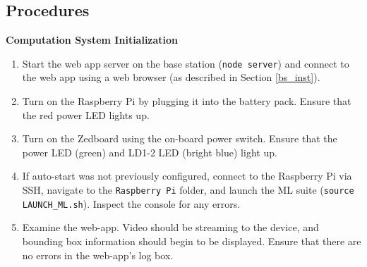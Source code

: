
\newcommand{\checkbox}{\makebox[3ex][r]{\Large{$\square$}}}

\newenvironment{checklist}[1]{%
  \renewcommand{\item}[2]{%
    ##1\dotfill\makebox{\uppercase{##2}}\\
  }
  \newcommand{\step}[1]{%
    \hspace*{10em}-\hspace*{\labelsep}##1\\
  }
  \begin{tabular}{p{0.9\linewidth}}
     \toprule
       \multicolumn{1}{c}{\textbf{\uppercase{#1}}}\\
     \midrule
}{\bottomrule\end{tabular}\vspace{1em}}


\subsection{Procedures}

\textbf{Computation System Initialization}
\begin{enumerate}
\item Start the web app server on the base station (\texttt{node server}) and connect to the web app using a web browser (as described in Section \ref{bs_inst}).
\item Turn on the Raspberry Pi by plugging it into the battery pack. Ensure that the red power LED lights up.
\item Turn on the Zedboard using the on-board power switch. Ensure that the power LED (green) and LD1-2 LED (bright blue) light up.
\item If auto-start was not previously configured, connect to the Raspberry Pi via SSH, navigate to the \texttt{Raspberry Pi} folder, and launch the ML suite (\texttt{source LAUNCH\_ML.sh}). Inspect the console for any errors.
\item Examine the web-app. Video should be streaming to the device, and bounding box information should begin to be displayed. Ensure that there are no errors in the web-app's log box.
\end{enumerate}

